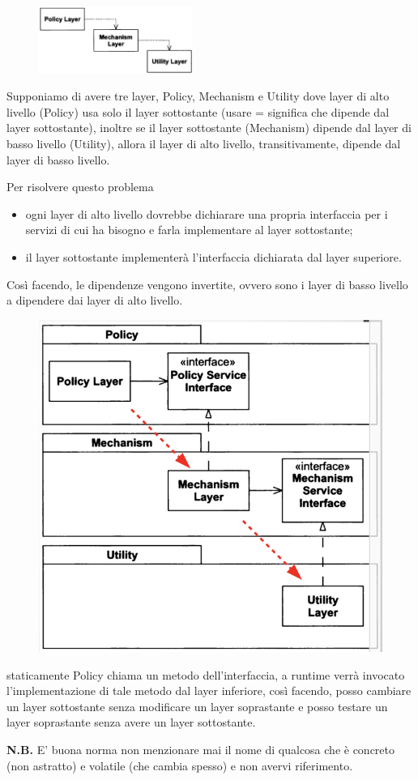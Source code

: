 \begin{figure}
  \includegraphics[width=5cm]{../../immagini/principio_SOLID/architetturaOOnoDIP}  
\end{figure}
Supponiamo di avere tre layer, Policy, Mechanism e Utility dove layer di alto livello (Policy) usa solo il layer sottostante
(usare = significa che dipende dal layer sottostante), inoltre se il layer sottostante (Mechanism) dipende dal layer di basso livello (Utility), allora il layer di alto 
livello, transitivamente, dipende dal layer di basso livello.

Per risolvere questo problema
\begin{itemize}
  \item ogni layer di alto livello dovrebbe dichiarare una propria interfaccia per i servizi di cui ha bisogno e farla implementare al layer sottostante;
  \item il layer sottostante implementerà l'interfaccia dichiarata dal layer superiore.
\end{itemize}

Così facendo, le dipendenze vengono invertite, ovvero sono i layer di basso livello a dipendere dai layer di alto livello.
\begin{figure}[H]
  \centering
  \includegraphics[width=0.35\linewidth]{../../immagini/principio_SOLID/architetturaOODIP}  
\end{figure}

staticamente Policy chiama un metodo dell'interfaccia, a runtime verrà invocato l'implementazione di tale metodo dal layer inferiore, così facendo, posso cambiare un
layer sottostante senza modificare un layer soprastante e posso testare un layer soprastante senza avere un layer sottostante. 
\medskip

\textbf{N.B.} E' buona norma non menzionare mai il nome di qualcosa che è concreto (non astratto) e volatile (che cambia spesso) e non avervi riferimento.